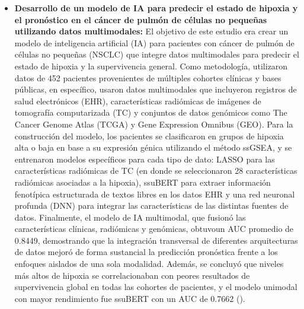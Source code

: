 \begin{itemize}
    \item \textbf{Desarrollo de un modelo de IA para predecir el estado de hipoxia y el pronóstico en el cáncer de pulmón de células no pequeñas utilizando datos multimodales:} El objetivo de este estudio era crear un modelo de inteligencia artificial (IA) para pacientes con cáncer de pulmón de células no pequeñas (NSCLC) que integre datos multimodales para predecir el estado de hipoxia y la supervivencia general. Como metodología, utilizaron datos de 452 pacientes provenientes de múltiples cohortes clínicas y bases públicas, en específico, usaron datos multimodales que incluyeron registros de salud electrónicos (EHR), características radiómicas de imágenes de tomografía computarizada (TC) y conjuntos de datos genómicos como The Cancer Genome Atlas (TCGA) y Gene Expression Omnibus (GEO). Para la construcción del modelo, los pacientes se clasificaron en grupos de hipoxia alta o baja en base a su expresión génica utilizando el método ssGSEA, y se entrenaron modelos específicos para cada tipo de dato: LASSO para las características radiómicas de TC (en donde se seleccionaron 28 características radiómicas asociadas a la hipoxia), ssuBERT para extraer información fenotípica estructurada de textos libres en los datos EHR y una red neuronal profunda (DNN) para integrar las características de las distintas fuentes de datos. Finalmente, el modelo de IA multimodal, que fusionó las características clínicas, radiómicas y genómicas, obtuvoun AUC promedio de 0.8449, demostrando que la integración transversal de diferentes arquitecturas de datos mejoró de forma sustancial la predicción pronóstica frente a los enfoques aislados de una sola modalidad. Además, se concluyó que niveles más altos de hipoxia se correlacionaban con peores resultados de supervivencia global en todas las cohortes de pacientes, y el modelo unimodal con mayor rendimiento fue ssuBERT con un AUC de 0.7662 (\cite{article2}).

\end{itemize}
